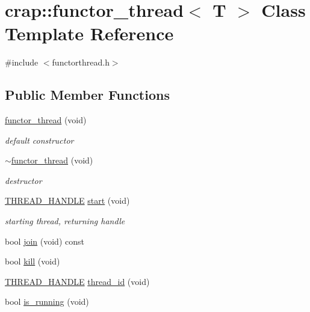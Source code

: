 \hypertarget{classcrap_1_1functor__thread}{\section{crap\-:\-:functor\-\_\-thread$<$ T $>$ Class Template Reference}
\label{classcrap_1_1functor__thread}
}


{\ttfamily \#include $<$functorthread.\-h$>$}

\subsection*{Public Member Functions}
\begin{DoxyCompactItemize}
\item 
\hyperlink{classcrap_1_1functor__thread_a7ab58224af9027bfd4b2764c63ce01b9}{functor\-\_\-thread} (void)
\begin{DoxyCompactList}\small\item\em default constructor \end{DoxyCompactList}\item 
\hyperlink{classcrap_1_1functor__thread_ab0da9c161a89d8ffbecf83ed0e498564}{$\sim$functor\-\_\-thread} (void)
\begin{DoxyCompactList}\small\item\em destructor \end{DoxyCompactList}\item 
\hyperlink{threading_8h_a14c0f3061b88e46a595ca858fed22b03}{T\-H\-R\-E\-A\-D\-\_\-\-H\-A\-N\-D\-L\-E} \hyperlink{classcrap_1_1functor__thread_ac8c029bb5ad6352c271bb44ba3d78ce2}{start} (void)
\begin{DoxyCompactList}\small\item\em starting thread, returning handle \end{DoxyCompactList}\item 
bool \hyperlink{classcrap_1_1functor__thread_a05dbbfe8854c00b060ff8c1be3ef22a7}{join} (void) const 
\item 
bool \hyperlink{classcrap_1_1functor__thread_a7229400ebf7b59abbab464285d2bf24b}{kill} (void)
\item 
\hyperlink{threading_8h_a14c0f3061b88e46a595ca858fed22b03}{T\-H\-R\-E\-A\-D\-\_\-\-H\-A\-N\-D\-L\-E} \hyperlink{classcrap_1_1functor__thread_aad99a90b20f331abf7152c3e04dee4b7}{thread\-\_\-id} (void)
\item 
bool \hyperlink{classcrap_1_1functor__thread_ab6ac5118e9c7b8e386b71f03d079dc11}{is\-\_\-running} (void)
\end{DoxyCompactItemize}


